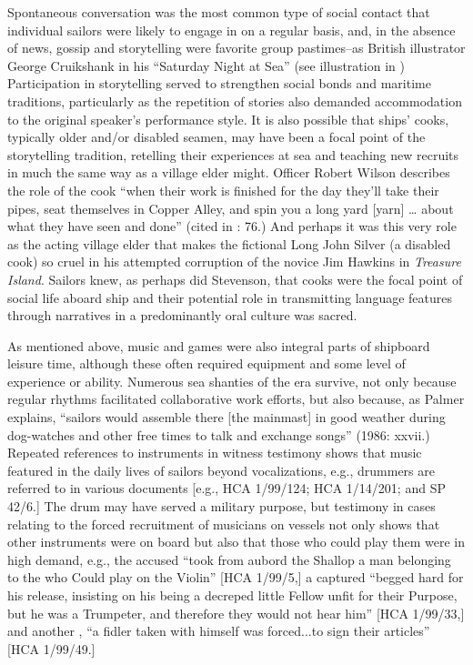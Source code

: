 Spontaneous conversation was the most common type of social contact that individual sailors were likely to engage in on a regular basis, and, in the absence of news, gossip and storytelling were favorite group pastimes--as British illustrator George Cruikshank in his “Saturday Night at Sea” (see illustration in ) Participation in storytelling served to strengthen social bonds and maritime traditions, particularly as the repetition of stories also demanded accommodation to the original speaker’s performance style. It is also possible that ships’ cooks, typically older and/or disabled seamen, may have been a focal point of the storytelling tradition, retelling their experiences at sea and teaching new recruits in much the same way as a village elder might. Officer Robert Wilson describes the role of the cook “when their work is finished for the day they’ll take their pipes, seat themselves in Copper Alley, and spin you a long yard [yarn] … about what they have seen and done” (cited in \citealt{AdkinsAdkins2008}: 76.) And perhaps it was this very role as the acting village elder that makes the fictional Long John Silver (a disabled cook) so cruel in his attempted corruption of the novice Jim Hawkins in  \textit{Treasure Island}. Sailors knew, as perhaps did Stevenson, that cooks were the focal point of social life aboard ship and their potential role in transmitting language features through narratives in a predominantly oral culture was sacred. 

As mentioned above, music and games were also integral parts of shipboard leisure time, although these often required equipment and some level of experience or ability. Numerous sea shanties of the era survive, not only because regular rhythms facilitated collaborative work efforts, but also because, as Palmer explains, “sailors would assemble there [the mainmast] in good weather during dog-watches and other free times to talk and exchange songs” (1986: xxvii.) Repeated references to instruments in witness testimony shows that music featured in the daily lives of sailors beyond vocalizations, e.g., drummers are referred to in various documents [e.g., HCA 1/99/124; HCA 1/14/201; and SP 42/6.] The drum may have served a military purpose, but testimony in cases relating to the forced recruitment of musicians on  vessels not only  shows that other instruments were on board but also that those who could play them were in high demand, e.g., the accused “took from aubord the Shallop a man belonging to the  who Could play on the Violin” [HCA 1/99/5,] a captured  “begged hard for his release, insisting on his being a decreped little Fellow unfit for their Purpose, but he was a Trumpeter, and therefore they would not hear him” [HCA 1/99/33,] and another , “a fidler taken with himself was forced...to sign their articles” [HCA 1/99/49.] 

